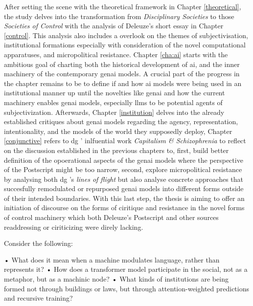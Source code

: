 After setting the scene with the theoretical framework in Chapter \ref{theoretical}, the study delves into the transformation from \textit{Disciplinary Societies} to those \textit{Societies of Control} with the analysis of Deleuze's short essay  in Chapter \ref{control}. This analysis also includes a overlook on the themes of subjectivisation, institutional formations especially with consideration of the novel computational apparatuses, and micropolitical resistance. Chapter \ref{cha:ai} starts with the ambitious goal of charting both the historical development of \gls{ai}, and the inner machinery of the contemporary \gls{genai} models. A crucial part of the progress in the chapter remains to be to define if and how \gls{ai} models were being used in an institutional manner up until the novelties like \gls{genai} and how the current machinery enables \gls{genai} models, especially \glspl{llm} to be potential agents of subjectivization. Afterwards, Chapter \ref{institution} delves into the already established critiques about \gls{genai} models regarding the agency, representation, intentionality, and the models of the world they supposedly deploy, Chapter \ref{conjunctive} refers to \gls{dg} ' inlfuential work \textit{Capitalism \& Schizophrenia} to reflect on the discussion established in the previous chapters to, first, build better definition of the opoerational aspects of the \gls{genai} models where the perspective of the Postscript might be too narrow, second, explore micropolitical resistance by analysing both \gls{dg} 's \textit{lines of flight} but also analyse concrete approaches that succesfully remodulated or repurposed \gls{genai} models into different forms outside of their intended boundaries. With this last step, the thesis is aiming to offer an initiation of discourse on the forms of ciritique and resistance in the novel forms of control machinery which both Deleuze's Postscript and other sources readdressing or ciriticizing were direly lacking.

\begin{orangebox}
	Consider the following:


	•	What does it mean when a machine modulates language, rather than represents it?
	•	How does a transformer model participate in the social, not as a metaphor, but as a machinic node?
	•	What kinds of institutions are being formed not through buildings or laws, but through attention-weighted predictions and recursive training?
\end{orangebox}



